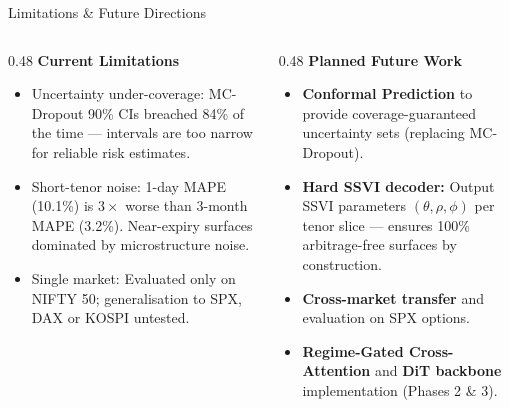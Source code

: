 \documentclass[aspectratio=169,10pt]{beamer}
\begin{document}
\begin{frame}{Limitations \& Future Directions}
  \begin{columns}[T]
    \begin{column}{0.48\textwidth}
      \textbf{Current Limitations}
      \begin{itemize}\itemsep5pt
        \item \alert{Uncertainty under-coverage:} MC-Dropout 90\% CIs breached 84\% of the time --- intervals are too narrow for reliable risk estimates.
        \item \alert{Short-tenor noise:} 1-day MAPE (10.1\%) is $3\times$ worse than 3-month MAPE (3.2\%). Near-expiry surfaces dominated by microstructure noise.
        \item \alert{Single market:} Evaluated only on NIFTY 50; generalisation to SPX, DAX or KOSPI untested.
      \end{itemize}
    \end{column}
    \begin{column}{0.48\textwidth}
      \textbf{Planned Future Work}
      \begin{itemize}\itemsep5pt
        \item \textbf{Conformal Prediction} to provide coverage-guaranteed uncertainty sets (replacing MC-Dropout).
        \item \textbf{Hard SSVI decoder:} Output SSVI parameters $(\theta,\rho,\phi)$ per tenor slice --- ensures 100\% arbitrage-free surfaces by construction.
        \item \textbf{Cross-market transfer} and evaluation on SPX options.
        \item \textbf{Regime-Gated Cross-Attention} and \textbf{DiT backbone} implementation (Phases 2 \& 3).
      \end{itemize}
    \end{column}
  \end{columns}
\end{frame}
\end{document}
